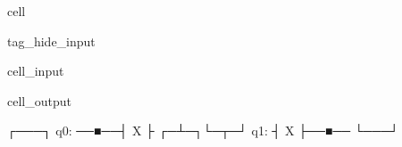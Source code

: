 \documentclass[letterpaper,10pt,english]{jupyterBook}
\begin{document}
\begin{sphinxuseclass}{cell}
\begin{sphinxuseclass}{tag_hide_input}\begin{sphinxVerbatimInput}

\begin{sphinxuseclass}{cell_input}
\begin{sphinxVerbatim}[commandchars=\\\{\}]
   


\end{sphinxVerbatim}

\end{sphinxuseclass}\end{sphinxVerbatimInput}
\begin{sphinxVerbatimOutput}

\begin{sphinxuseclass}{cell_output}
\begin{sphinxVerbatim}[commandchars=\\\{\}]
          ┌───┐
q\PYGZus{}0: ──■──┤ X ├
     ┌─┴─┐└─┬─┘
q\PYGZus{}1: ┤ X ├──■──
     └───┘
\end{sphinxVerbatim}

\end{sphinxuseclass}\end{sphinxVerbatimOutput}

\end{sphinxuseclass}
\end{sphinxuseclass}
\end{document}
